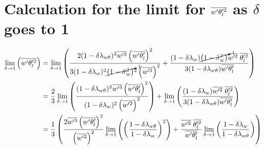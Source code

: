 \section{Calculation for the limit for \texorpdfstring{$\overline{w' \theta_l'^2}$}{wprimethetalprime2bar} as \texorpdfstring{$\delta$}{delta} goes to 1}
\label{sec:calculation-for-the-limit-for-wprimethetalprime2bar-as-delta-goes-to-1}

\begin{align}
    \label{eq:limit_wprimethetalprime2bar_delta_to_1_calc}
    \lim_{\delta \to 1}\left(\overline{w' \theta_l'^2}\right)
    &= \lim_{\delta \to 1}
    \left(
    \frac{
        2 (1-\delta \lambda_{w \theta})^2 \overline{w'^3} \left(\overline{w' \theta_l'} \right)^2
    }
    {3 (1-\delta \lambda_w)^2 \cancelto{1}{\left( 1 - \tilde{\sigma}_w^2 \right)}^2 \left(\overline{w'^2} \right)^2} +
    \frac{
        (1-\delta \lambda_w) \cancelto{1}{\left( 1 - \tilde{\sigma}_w^2 \right)} \overline{w'^2} \; \overline{\theta_l'^2}
    }
    {3 (1-\delta \lambda_{w \theta}) \overline{w' \theta_l'}}
    \right)
    \\
    &= \frac{2}{3} \lim_{\delta \to 1}
    \left(
    \frac{(1-\delta \lambda_{w \theta})^2 \overline{w'^3} \left(\overline{w' \theta_l'} \right)^2}
    {(1-\delta \lambda_w)^2 \left(\overline{w'^2} \right)^2}
    \right) +
    \lim_{\delta \to 1}
    \left(
    \frac{
        (1-\delta \lambda_w) \overline{w'^2} \; \overline{\theta_l'^2}
    }
    {
        3 (1-\delta \lambda_{w \theta}) \overline{w' \theta_l'}
    }
    \right)
    \\
    &= \frac{1}{3}\left(
    \frac{2 \overline{w'^3} \left(\overline{w' \theta_l'} \right)^2}{\left(\overline{w'^2} \right)^2} \lim_{\delta \to 1}
    \left(\left(\frac{1-\delta \lambda_{w \theta}}{1-\delta \lambda_w}\right)^2\right) +
    \frac{\overline{w'^2} \; \overline{\theta_l'^2}}{\overline{w' \theta_l'}}
    \lim_{\delta \to 1}
    \left(\frac{1-\delta \lambda_w}{1-\delta \lambda_{w \theta}}\right)
    \right)
\end{align}